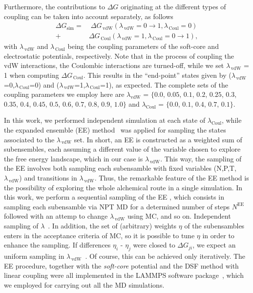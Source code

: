 \documentclass[3p,twocolumn]{elsarticle}
\begin{document}
Furthermore, the contributions to $\Delta G$ originating at the different types of coupling can be taken into account separately, as follows
\begin{equation}
\begin{split}
\Delta G_{\text{sim}} =& \; \Delta G_{\,\text{vdW}} (\lambda_{\,\text{vdW}} = 0\rightarrow  1, \lambda_{\, \text{Coul}} = 0) \\
+ \; &\Delta G_{\,\text{Coul}} (\lambda_{\, \text{vdW}} = 1,\lambda_{\,\text{Coul}} = 0 \rightarrow 1),
\end{split}
\end{equation}
with $\lambda_{\,\text{vdW}}$ and $\lambda_{\,\text{Coul}}$ being the coupling parameters of the soft-core and electrostatic potentials, respectively. Note that in the process of coupling the vdW interactions, the Coulombic interactions are turned-off, while we set $\lambda_{\,\text{vdW}}$ = 1 when computing $\Delta G_{\,\text{Coul}}$.  This results in the ``end-point'' states given by ($\lambda_{\,\text{vdW}}$=0,$\lambda_{\,\text{Coul}}$=0) and ($\lambda_{\,\text{vdW}}$=1,$\lambda_{\,\text{Coul}}$=1), as expected. The complete sets of the coupling parameters we employ here are $\lambda_{\text{vdW}}$ = $\{0.0$, $0.05$, $0.1$, $0.2$, $0.25$, $0.3$, $0.35$, $0.4$, $0.45$, $0.5$, $0.6$, $0.7$, $0.8$, $0.9$, $1.0\}$ and $\lambda_{\text{Coul}}$ = $\{0.0$, $0.1$, $0.4$, $0.7$, $0.1\}$.

In this work, we performed independent simulation at each state of $\lambda_{\text{Coul}}$, while the expanded ensemble (EE) method~\cite{Lyubartsev_1992} was applied for sampling the states associated to the $\lambda_{\,\text{vdW}}$ set. In short, an EE is constructed as a weighted sum of subensembles, each assuming a different value of the variable chosen to explore the free energy landscape, which in our case is $\lambda_{\,\text{vdW}}$. This way, the sampling of the EE involves both sampling each subensamble with fixed variables (N,P,T,$\lambda_{\,\text{vdW}}$) and transitions in $\lambda_{\,\text{vdW}}$. Thus, the remarkable feature of the EE method is the possibility of exploring the whole alchemical route in a single simulation. In this work, we perform a sequential sampling of the EE \cite{Chodera_2011_2}, which consists in sampling each subensamble via NPT MD for a determined number of steps $N^{\text{EE}}$ followed with an attemp to change $\lambda_{\,\text{vdW}}$ using MC, and so on. Independent sampling of $\lambda$~\cite{Chodera_2011_2}. In addition, the set of (arbitrary) weights $\eta$ of the subensambles enters in the acceptance criteria of MC, so it is possible to tune $\eta$ in order to enhance the sampling. If differences $\eta_i$ - $\eta_j$ were closed to $\Delta G_{ji}$, we expect an uniform sampling in $\lambda_{\,\text{vdW}}$~\cite{Lyubartsev_1992}. Of course, this can be achieved only iteratively. The EE procedure, together with the \textit{soft-core} potential and the DSF method with linear coupling were all implemented in the LAMMPS software package~\cite{Plimpton1995}, which we employed for carrying out all the MD simulations.
\end{document}
